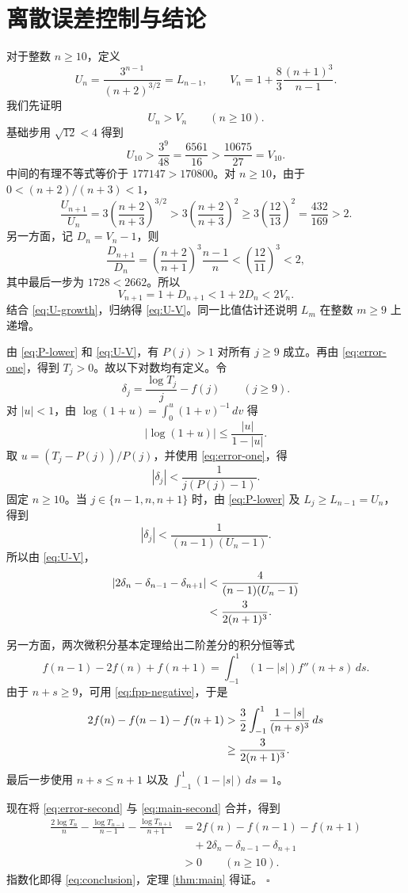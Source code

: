 \documentclass[UTF8,fontset=fandol,11pt]{ctexart}
\begin{document}
\section{离散误差控制与结论}

对于整数 $n\ge10$，定义
\[
U_n=\frac{3^{n-1}}{(n+2)^{3/2}}=L_{n-1},
\qquad
V_n=1+\frac83\frac{(n+1)^3}{n-1}.
\]
我们先证明
\begin{equation}\label{eq:U-V}
U_n>V_n\qquad(n\ge10).
\end{equation}
基础步用 $\sqrt{12}<4$ 得到
\[
U_{10}>\frac{3^9}{48}=\frac{6561}{16}
>\frac{10675}{27}=V_{10}.
\]
中间的有理不等式等价于 $177147>170800$。对 $n\ge10$，由于 $0<(n+2)/(n+3)<1$，
\begin{equation}\label{eq:U-growth}
\frac{U_{n+1}}{U_n}
=3\left(\frac{n+2}{n+3}\right)^{3/2}
>3\left(\frac{n+2}{n+3}\right)^2
\ge3\left(\frac{12}{13}\right)^2
=\frac{432}{169}>2.
\end{equation}
另一方面，记 $D_n=V_n-1$，则
\[
\frac{D_{n+1}}{D_n}
=\left(\frac{n+2}{n+1}\right)^3\frac{n-1}{n}
<\left(\frac{12}{11}\right)^3<2,
\]
其中最后一步为 $1728<2662$。所以
\[
V_{n+1}=1+D_{n+1}<1+2D_n<2V_n.
\]
结合 \eqref{eq:U-growth}，归纳得 \eqref{eq:U-V}。同一比值估计还说明 $L_m$ 在整数 $m\ge9$ 上递增。

由 \eqref{eq:P-lower} 和 \eqref{eq:U-V}，有 $P(j)>1$ 对所有 $j\ge9$ 成立。再由 \eqref{eq:error-one}，得到 $T_j>0$。故以下对数均有定义。令
\[
\delta_j=\frac{\log T_j}{j}-f(j)
\qquad(j\ge9).
\]
对 $|u|<1$，由 $\log(1+u)=\int_0^u(1+v)^{-1}\,dv$ 得
\[
|\log(1+u)|\le\frac{|u|}{1-|u|}.
\]
取 $u=(T_j-P(j))/P(j)$，并使用 \eqref{eq:error-one}，得
\begin{equation}\label{eq:delta}
|\delta_j|<\frac1{j(P(j)-1)}.
\end{equation}
固定 $n\ge10$。当 $j\in\{n-1,n,n+1\}$ 时，由 \eqref{eq:P-lower} 及 $L_j\ge L_{n-1}=U_n$，得到
\[
|\delta_j|<\frac1{(n-1)(U_n-1)}.
\]
所以由 \eqref{eq:U-V}，
\begin{align}
|2\delta_n-\delta_{n-1}-\delta_{n+1}|
&<\frac4{(n-1)(U_n-1)}\notag\\
&<\frac3{2(n+1)^3}. \label{eq:error-second}
\end{align}

另一方面，两次微积分基本定理给出二阶差分的积分恒等式
\[
f(n-1)-2f(n)+f(n+1)
=\int_{-1}^{1}(1-|s|)f''(n+s)\,ds.
\]
由于 $n+s\ge9$，可用 \eqref{eq:fpp-negative}，于是
\begin{align}
2f(n)-f(n-1)-f(n+1)
&>\frac32\int_{-1}^{1}\frac{1-|s|}{(n+s)^3}\,ds\notag\\
&\ge\frac3{2(n+1)^3}. \label{eq:main-second}
\end{align}
最后一步使用 $n+s\le n+1$ 以及
$\int_{-1}^{1}(1-|s|)\,ds=1$。

现在将 \eqref{eq:error-second} 与 \eqref{eq:main-second} 合并，得到
\begin{align*}
\frac{2\log T_n}{n}
-\frac{\log T_{n-1}}{n-1}
-\frac{\log T_{n+1}}{n+1}
&=2f(n)-f(n-1)-f(n+1)\\
&\quad+2\delta_n-\delta_{n-1}-\delta_{n+1}\\
&>0
\qquad(n\ge10).
\end{align*}
指数化即得 \eqref{eq:conclusion}，定理 \ref{thm:main} 得证。
\hfill$\square$
\end{document}
